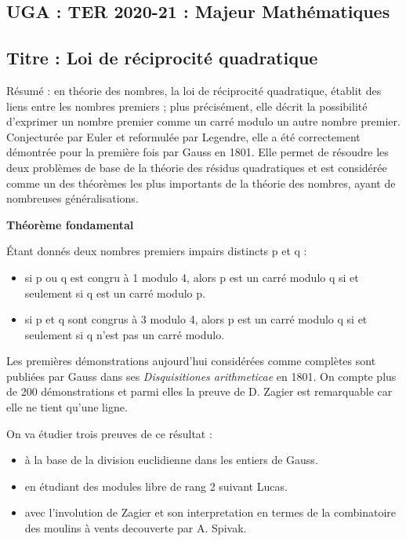 \documentclass[]{article}
\date{}
\providecommand{\tightlist}{%
  \setlength{\itemsep}{0pt}\setlength{\parskip}{0pt}}
\begin{document}
\subsection{UGA : TER 2020-21 : Majeur
Mathématiques}\label{uga-ter-2020-21-majeur-mathuxe9matiques}

\subsection{Titre : Loi de réciprocité
quadratique}\label{titre-loi-de-ruxe9ciprocituxe9-quadratique}

Résumé : en théorie des nombres, la loi de réciprocité quadratique,
établit des liens entre les nombres premiers ; plus précisément, elle
décrit la possibilité d'exprimer un nombre premier comme un carré modulo
un autre nombre premier. Conjecturée par Euler et reformulée par
Legendre, elle a été correctement démontrée pour la première fois par
Gauss en 1801. Elle permet de résoudre les deux problèmes de base de la
théorie des résidus quadratiques et est considérée comme un des
théorèmes les plus importants de la théorie des nombres, ayant de
nombreuses généralisations.

\textbf{Théorème fondamental}

Étant donnés deux nombres premiers impairs distincts p et q :

\begin{itemize}
\tightlist
\item
  si p ou q est congru à 1 modulo 4, alors p est un carré modulo q si et
  seulement si q est un carré modulo p.
\item
  si p et q sont congrus à 3 modulo 4, alors p est un carré modulo q si
  et seulement si q n'est pas un carré modulo.
\end{itemize}

Les premières démonstrations aujourd'hui considérées comme complètes
sont publiées par Gauss dans ses \emph{Disquisitiones arithmeticae} en
1801. On compte plus de 200 démonstrations et parmi elles la preuve de
D. Zagier est remarquable car elle ne tient qu'une ligne.

On va étudier trois preuves de ce résultat :

\begin{itemize}
\tightlist
\item
  à la base de la division euclidienne dans les entiers de Gauss.
\item
  en étudiant des modules libre de rang 2 suivant Lucas.
\item
  avec l'involution de Zagier et son interpretation en termes de la
  combinatoire des moulins à vents decouverte par A. Spivak.
\end{itemize}
\end{document}

